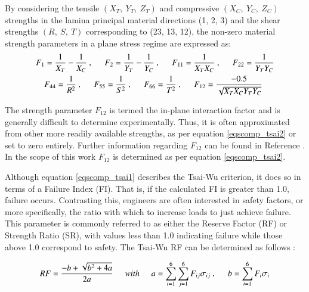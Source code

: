 By considering the tensile $(X_T,\ Y_T,\ Z_T)$ and compressive $(X_C,\ Y_C,\ Z_C)$ strengths in the lamina principal material directions (1, 2, 3) and the shear strengths $(R,\ S,\ T)$ corresponding to (23, 13, 12), the non-zero material strength parameters in a plane stress regime are expressed as:
\begin{gather} 
	\begin{aligned}
		&F_1 = \frac{1}{X_T} - \frac{1}{X_C}\ ,
		\hspace{5mm}
		F_2 = \frac{1}{Y_T} - \frac{1}{Y_C}\ ,
		\hspace{5mm}
		F_{11} = \frac{1}{X_TX_C}\ ,
		\hspace{5mm}
		F_{22} = \frac{1}{Y_TY_C}
		\\
		&\ \ \ \ 
		F_{44} = \frac{1}{R^2}\ ,
		\hspace{5mm}
		F_{55} = \frac{1}{S^2}\ ,
		\hspace{5mm}
		F_{66} = \frac{1}{T^2}\ ,
		\hspace{5mm}
		F_{12} = \frac{-0.5}{\sqrt{X_TX_CY_TY_C}}
		\label{eqscomp_tsai2}
	\end{aligned}
\end{gather}

The strength parameter $F_{12}$ is termed the in-plane interaction factor and is generally difficult to determine experimentally. Thus, it is often approximated from other more readily available strengths, as per equation \ref{eqscomp_tsai2} or set to zero entirely. Further information regarding $F_{12}$ can be found in Reference \cite{tsai12}. In the scope of this work $F_{12}$ is determined as per equation \ref{eqscomp_tsai2}.

Although equation \ref{eqscomp_tsai1} describes the Tsai-Wu criterion, it does so in terms of a Failure Index (FI). That is, if the calculated FI is greater than 1.0, failure occurs. Contrasting this, engineers are often interested in safety factors, or more specifically, the ratio with which to increase loads to just achieve failure. This parameter is commonly referred to as either the Reserve Factor (RF) or Strength Ratio (SR), with values less than 1.0 indicating failure while those above 1.0 correspond to safety. The Tsai-Wu RF can be determined as follows \cite{kolios2012evaluation}:

\begin{equation} 
RF = \frac{-b + \sqrt{b^2 + 4a}}{2a}
\hspace{5mm}with\hspace{5mm}
a = \sum_{i=1}^{6} \sum_{j=1}^{6} F_{ij} \sigma_{ij}\ ,
\hspace{5mm}
b = \sum_{i=1}^{6} F_i \sigma_i 
\label{eqscomp_stress_recovery3}
\end{equation}